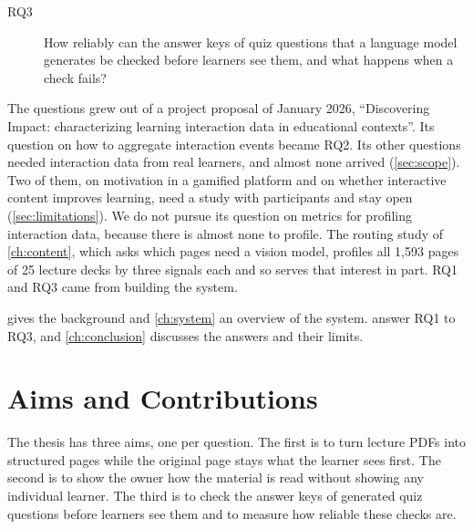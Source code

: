 \begin{description}
  \item[RQ3] How reliably can the answer keys of quiz questions that a
    language model generates be checked before learners see them, and what
    happens when a check fails?
\end{description}

The questions grew out of a project proposal of January 2026,
\enquote{Discovering Impact: characterizing learning interaction data in
educational contexts}. Its question on how to aggregate interaction events
became RQ2. Its other questions needed interaction data from real learners,
and almost none arrived (\cref{sec:scope}). Two of them, on motivation in a
gamified platform and on whether interactive content improves learning, need
a study with participants and stay open (\cref{sec:limitations}). We do not
pursue its question on metrics for profiling interaction data, because there
is almost none to profile. The routing study of \cref{ch:content}, which asks
which pages need a vision model, profiles all 1{,}593 pages of 25 lecture decks
by three signals each and so serves that interest in part. RQ1 and RQ3 came
from building the system.

 gives the background and \cref{ch:system} an overview of
the system.  answer RQ1 to RQ3, and
\cref{ch:conclusion} discusses the answers and their limits.

\section{Aims and Contributions}
\label{sec:aims}

The thesis has three aims, one per question. The first is to turn lecture
PDFs into structured pages while the original page stays what the learner
sees first. The second is to show the owner how the material is read without
showing any individual learner. The third is to check the answer keys of
generated quiz questions before learners see them and to measure how reliable
these checks are.

